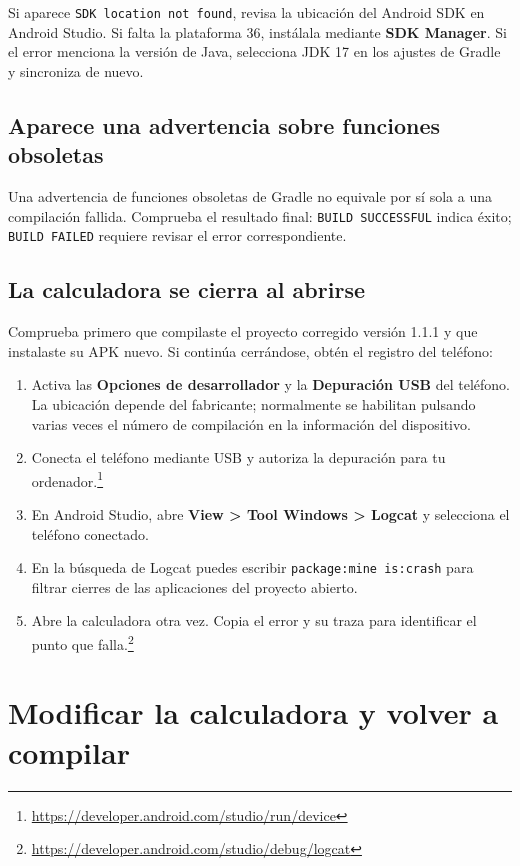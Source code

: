 \documentclass[12pt,a4paper]{article}
\begin{document}
Si aparece \texttt{SDK location not found}, revisa la ubicación del Android SDK en Android Studio. Si falta la plataforma 36, instálala mediante \textbf{SDK Manager}. Si el error menciona la versión de Java, selecciona JDK 17 en los ajustes de Gradle y sincroniza de nuevo.

\subsection{Aparece una advertencia sobre funciones obsoletas}

Una advertencia de funciones obsoletas de Gradle no equivale por sí sola a una compilación fallida. Comprueba el resultado final: \texttt{BUILD SUCCESSFUL} indica éxito; \texttt{BUILD FAILED} requiere revisar el error correspondiente.

\subsection{La calculadora se cierra al abrirse}

Comprueba primero que compilaste el proyecto corregido versión 1.1.1 y que instalaste su APK nuevo. Si continúa cerrándose, obtén el registro del teléfono:

\begin{enumerate}
    \item Activa las \textbf{Opciones de desarrollador} y la \textbf{Depuración USB} del teléfono. La ubicación depende del fabricante; normalmente se habilitan pulsando varias veces el número de compilación en la información del dispositivo.
    \item Conecta el teléfono mediante USB y autoriza la depuración para tu ordenador.\footnote{\url{https://developer.android.com/studio/run/device}}
    \item En Android Studio, abre \textbf{View > Tool Windows > Logcat} y selecciona el teléfono conectado.
    \item En la búsqueda de Logcat puedes escribir \texttt{package:mine is:crash} para filtrar cierres de las aplicaciones del proyecto abierto.
    \item Abre la calculadora otra vez. Copia el error y su traza para identificar el punto que falla.\footnote{\url{https://developer.android.com/studio/debug/logcat}}
\end{enumerate}

\section{Modificar la calculadora y volver a compilar}
\end{document}
